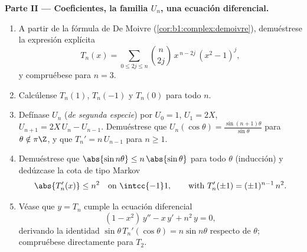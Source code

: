 \begin{problem}
\medskip
\noindent\textbf{Parte II --- Coeficientes, la familia $U_n$, una
ecuación diferencial.}
\begin{enumerate}[resume]
  \item A partir de la fórmula de De Moivre
        (\cref{cor:b1:complex:demoivre}), demuéstrese la expresión
        explícita
        \[
        T_n(x) = \sum_{0 \leq 2j \leq n} \binom{n}{2j}\,
        x^{\,n-2j}\,(x^2 - 1)^j ,
        \]
        y compruébese para $n = 3$.
  \item Calcúlense $T_n(1)$, $T_n(-1)$ y $T_n(0)$ para todo $n$.
  \item Defínase $U_n$ (\emph{de segunda especie}) por $U_0 = 1$,
        $U_1 = 2X$, $U_{n+1} = 2X\,U_n - U_{n-1}$. Demuéstrese que
        $U_n(\cos\theta) = \frac{\sin(n+1)\theta}{\sin\theta}$ para
        $\theta \notin \pi\Z$, y que $T_n' = n\,U_{n-1}$ para
        $n \geq 1$.
  \item Demuéstrese que $\abs{\sin n\theta} \leq n\,\abs{\sin\theta}$
        para todo $\theta$ (inducción) y dedúzcase la cota de tipo
        Markov
        \[
        \abs{T_n'(x)} \leq n^2
        \quad\text{on } \intcc{-1}1,
        \qquad\text{with } T_n'(\pm1) = (\pm1)^{n-1}\,n^2 .
        \]
  \item Véase que $y = T_n$ cumple la ecuación diferencial
        \[
        (1 - x^2)\,y'' - x\,y' + n^2\,y = 0 ,
        \]
        derivando la identidad
        $\sin\theta\, T_n'(\cos\theta) = n\sin n\theta$ respecto de
        $\theta$; compruébese
        directamente para $T_2$.
\end{enumerate}


\end{problem}
